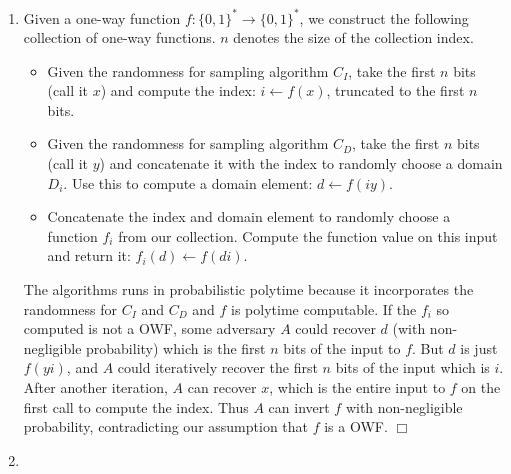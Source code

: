 \documentclass[12pt]{article}
\begin{document}
\begin{enumerate}
\item %
Given a one-way function $f:\{0,1\}^{*} \rightarrow \{0,1\}^{*}$,
we construct the following collection of one-way functions.
$n$ denotes the size of the collection index.

\begin{itemize}
\item Given the randomness for sampling algorithm $C_I$, take
the first $n$ bits (call it $x$) and compute the index: $i \gets f(x)$,
truncated to the first $n$ bits.
\item
Given the randomness for sampling algorithm $C_D$, take the first
$n$ bits (call it $y$) and concatenate it with the index to
randomly choose a domain $D_i$.
Use this to compute a domain element: $d \gets f(iy)$.
\item
Concatenate the index and domain element to randomly choose
a function $f_i$ from our collection. Compute the function value on this
input and return it: $f_i(d) \gets f(di)$.
\end{itemize}

The algorithms runs in probabilistic polytime because it incorporates the
randomness for $C_I$ and $C_D$ and $f$ is polytime computable.
If the $f_i$ so computed is not a OWF, some adversary $A$ could
recover $d$ (with non-negligible probability)
which is the first $n$ bits of the input to $f$.
But $d$ is just $f(yi)$, and $A$ could iteratively
recover the first $n$ bits of the input which is $i$. After another
iteration, $A$ can recover $x$, which is the entire input to $f$ on the
first call to compute the index. Thus $A$ can invert $f$ with
non-negligible probability, contradicting our assumption that $f$ is a OWF.
$\Box$

\item %
%


\end{enumerate}
\end{document}
